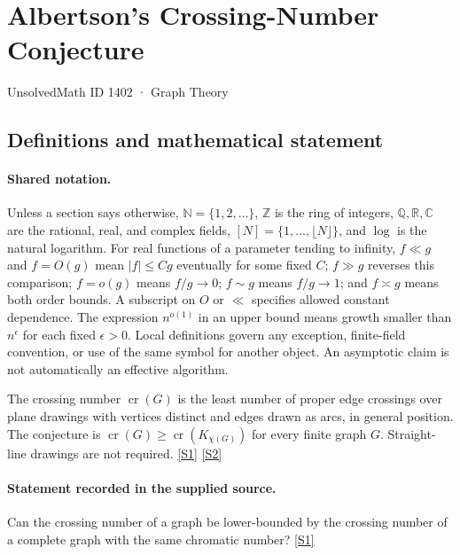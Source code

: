 \documentclass[11pt,a4paper]{article}
\newcommand{\N}{\mathbb{N}}
\newcommand{\Z}{\mathbb{Z}}
\newcommand{\Q}{\mathbb{Q}}
\newcommand{\R}{\mathbb{R}}
\newcommand{\C}{\mathbb{C}}
\newcommand{\sref}[2]{\hyperlink{source:#1:#2}{[S#2]}}
\begin{document}

\setcounter{section}{1401}

\section{Albertson’s Crossing-Number Conjecture}\label{1402}

{\small\sffamily UnsolvedMath ID 1402 · Graph Theory}

\subsection{Definitions and mathematical statement}

\paragraph{Shared notation.}Unless a section says otherwise, $\N=\{1,2,\ldots\}$,
$\Z$ is the ring of integers, $\Q,\R,\C$ are the rational, real, and complex
fields, $[N]=\{1,\ldots,\lfloor N\rfloor\}$, and $\log$ is the natural
logarithm. For real functions of a parameter tending to infinity,
$f\ll g$ and $f=O(g)$ mean $|f|\leq Cg$ eventually for some fixed $C$;
$f\gg g$ reverses this comparison; $f=o(g)$ means $f/g\to0$;
$f\sim g$ means $f/g\to1$; and $f\asymp g$ means both order bounds.
A subscript on $O$ or $\ll$ specifies allowed constant dependence.
The expression $n^{o(1)}$ in an upper bound means growth smaller than
$n^\epsilon$ for each fixed $\epsilon>0$. Local definitions govern any
exception, finite-field convention, or use of the same symbol for another
object. An asymptotic claim is not automatically an effective algorithm.



The crossing number $\operatorname{cr}(G)$ is the least number of proper edge crossings over plane drawings with vertices distinct and edges drawn as arcs, in general position. The conjecture is $\operatorname{cr}(G)\geq\operatorname{cr}(K_{\chi(G)})$ for every finite graph $G$. Straight-line drawings are not required. \sref{1402}{1} \sref{1402}{2}

\paragraph{Statement recorded in the supplied source.}
Can the crossing number of a graph be lower-bounded by the crossing number of a complete graph with the same chromatic number? \sref{1402}{1}
\end{document}
